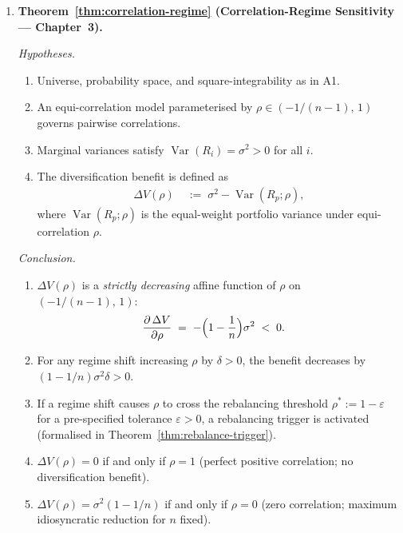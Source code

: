 \documentclass[12pt,openany]{book}
\DeclareMathOperator{\Var}{Var}
\numberwithin{equation}{chapter}
\theoremstyle{plain}
\theoremstyle{definition}
\theoremstyle{remark}
\begin{document}
\smallskip
\begin{enumerate}[label=\textbf{B\arabic*.}, leftmargin=*, widest=B3,
                  itemsep=6pt, parsep=2pt]

  \item \textbf{Theorem~\ref{thm:correlation-regime}
        (Correlation-Regime Sensitivity — Chapter~3).}

        \emph{Hypotheses.}
        \begin{enumerate}[label=(\roman*), itemsep=2pt]
          \item Universe, probability space, and square-integrability
                as in A1.
          \item An equi-correlation model parameterised by
                $\rho \in (-1/(n-1),\,1)$ governs pairwise
                correlations.
          \item Marginal variances satisfy
                $\Var(R_i) = \sigma^2 > 0$ for all $i$.
          \item The diversification benefit is defined as
                \begin{align}
                  \Delta V(\rho)
                    &\;:=\;
                      \sigma^2 - \Var(R_p;\rho),
                  \label{eq:sum-dv-def}
                \end{align}
                where $\Var(R_p;\rho)$ is the equal-weight portfolio
                variance under equi-correlation $\rho$.
        \end{enumerate}

        \emph{Conclusion.}
        \begin{enumerate}[label=(\alph*), itemsep=2pt]
          \item $\Delta V(\rho)$ is a \emph{strictly decreasing}
                affine function of $\rho$ on $(-1/(n-1),\,1)$:
                \begin{align}
                  \frac{\partial\,\Delta V}{\partial \rho}
                    &\;=\;
                      -\Bigl(1 - \frac{1}{n}\Bigr)\sigma^2
                      \;<\; 0.
                  \label{eq:sum-dv-deriv}
                \end{align}
          \item For any regime shift increasing $\rho$ by
                $\delta > 0$, the benefit decreases by
                $(1-1/n)\sigma^2\delta > 0$.
          \item If a regime shift causes $\rho$ to cross the
                rebalancing threshold $\rho^* := 1 - \varepsilon$
                for a pre-specified tolerance $\varepsilon > 0$,
                a rebalancing trigger is activated
                (formalised in Theorem~\ref{thm:rebalance-trigger}).
          \item $\Delta V(\rho) = 0$ if and only if $\rho = 1$
                (perfect positive correlation; no diversification
                benefit).
          \item $\Delta V(\rho) = \sigma^2(1 - 1/n)$ if and only if
                $\rho = 0$ (zero correlation; maximum idiosyncratic
                reduction for $n$ fixed).
        \end{enumerate}


\end{enumerate}
\end{document}
